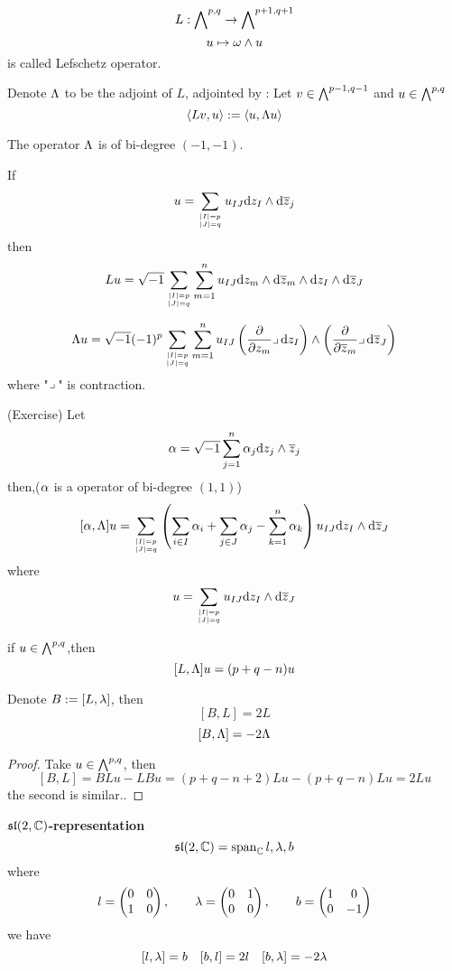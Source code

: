 \begin{definition}
$$L:\bigwedge\nolimits^{p,q}\to\bigwedge\nolimits^{p+1,q+1}$$
$$u\mapsto \omega\wedge u$$
is called Lefschetz operator.

Denote $\Lambda$ to be the adjoint of $L$, adjointed by :
Let $v\in\bigwedge\nolimits^{p-1,q-1}$ and $u\in\bigwedge\nolimits^{p,q}$
$$\langle Lv,u\rangle:=\langle u,\Lambda u\rangle$$
\end{definition}
The operator $\Lambda$ is of bi-degree $(-1,-1)$.

\begin{prop}
If
$$u=\sum_{|I|=p\atop |J|=q}u_{IJ}\mathrm{d} z_I\wedge\mathrm{d}\overline{z}_j$$
then
$$Lu=\sqrt{-1}\sum_{|I|=p\atop |J|=q}
 \sum_{m=1}^n
 u_{IJ}\mathrm{d} z_m\wedge\mathrm{d}\overline{z}_m\wedge\mathrm{d} z_I\wedge\mathrm{d}\overline{z}_J$$

$$
  \Lambda u
= \sqrt{-1}(-1)^p
  \sum_{|I|=p\atop|J|=q}
    \sum_{m=1}^n
      u_{IJ}
      \left(
        \frac{\partial } {\partial z_m}\lrcorner\,\mathrm{d} z_I
      \right)\wedge
      \left(
        \frac{\partial } {\partial \overline{z}_m}\lrcorner\,\mathrm{d}\overline{z}_J
      \right)
$$
where "$\lrcorner\,$" is contraction.
\end{prop}

\begin{cor}(Exercise)
Let
$$
  \alpha=\sqrt{-1}\sum_{j=1}^n
       \alpha_j\mathrm{d} z_j\wedge\overline{z}_j
$$
then,($\alpha$ is a operator of bi-degree $(1,1)$)
$$
  [\alpha,\Lambda]u
=
  \sum_{|I|=p\atop |J|=q}
    \left(
      \sum_{i\in I}
        \alpha_i
     +\sum_{j\in J}
        \alpha_j
     -\sum_{k=1}^n
        \alpha_k
    \right)
    u_{IJ}\mathrm{d} z_I\wedge\mathrm{d}\overline{z}_J
$$
where
$$u=\sum_{|I|=p\atop |J|=q}
u_{IJ}\mathrm{d} z_I\wedge\mathrm{d}\overline{z}_J$$
\end{cor}

\begin{cor}
if $u\in\bigwedge\nolimits^{p,q}$,then
$$[L,\Lambda]u=(p+q-n)u$$
\end{cor}

\begin{cor}
Denote $B:=[L,\lambda]$, then
$$[B,L]=2L$$
$$[B,\Lambda]=-2\Lambda$$
\end{cor}

\begin{proof}
Take $u\in\bigwedge\nolimits^{p,q}$, then
$$[B,L]=BLu-LBu=(p+q-n+2)Lu-(p+q-n)Lu=2Lu$$
the second is similar..
\end{proof}


\textbf{$\mathfrak{sl}(2,\mathbb{C})$-representation}
$$\mathfrak{sl}(2,\mathbb{C})=\operatorname{span}_{\mathbb{C}}{l,\lambda,b}$$
where
$$
  l=\begin{pmatrix}
      0 & 0\\
      1 & 0
    \end{pmatrix}
,\qquad
  \lambda=\begin{pmatrix}
      0 & 1\\
      0 & 0
    \end{pmatrix}
,\qquad
  b=\begin{pmatrix}
      1 & 0\\
      0 & -1
    \end{pmatrix}
$$
we have
$$[l,\lambda]=b\quad
  [b,l]=2l\quad
  [b,\lambda]=-2\lambda
$$

